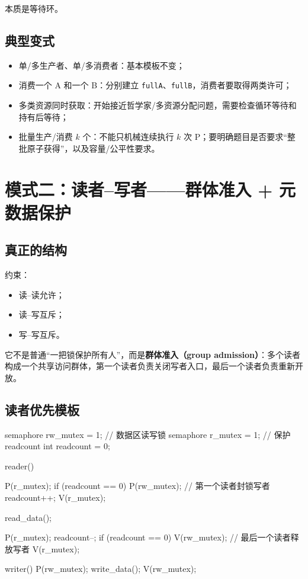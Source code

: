\documentclass[11pt,a4paper]{ctexart}
\newcommand{\kw}[1]{\textbf{#1}}
\newcommand{\code}[1]{\texttt{#1}}
\begin{document}
本质是等待环。

\subsection{典型变式}

\begin{itemize}
\item 单/多生产者、单/多消费者：基本模板不变；
\item 消费一个 A 和一个 B：分别建立 \code{fullA}、\code{fullB}，消费者要取得两类许可；
\item 多类资源同时获取：开始接近哲学家/多资源分配问题，需要检查循环等待和持有后等待；
\item 批量生产/消费 $k$ 个：不能只机械连续执行 $k$ 次 P；要明确题目是否要求“整批原子获得”，以及容量/公平性要求。
\end{itemize}

\section{模式二：读者--写者——群体准入 + 元数据保护}

\subsection{真正的结构}

约束：
\begin{itemize}
\item 读--读允许；
\item 读--写互斥；
\item 写--写互斥。
\end{itemize}
它不是普通“一把锁保护所有人”，而是\kw{群体准入（group admission）}：多个读者构成一个共享访问群体，第一个读者负责关闭写者入口，最后一个读者负责重新开放。

\subsection{读者优先模板}

\begin{codeblock}
semaphore rw_mutex = 1;  // 数据区读写锁
semaphore r_mutex  = 1;  // 保护 readcount
int readcount = 0;

reader() {
    P(r_mutex);
    if (readcount == 0)
        P(rw_mutex);      // 第一个读者封锁写者
    readcount++;
    V(r_mutex);

    read_data();

    P(r_mutex);
    readcount--;
    if (readcount == 0)
        V(rw_mutex);      // 最后一个读者释放写者
    V(r_mutex);
}

writer() {
    P(rw_mutex);
    write_data();
    V(rw_mutex);
}
\end{codeblock}
\end{document}
